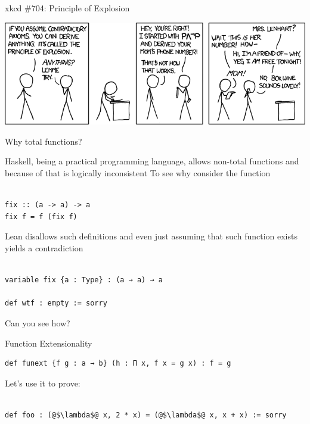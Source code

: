 \documentclass[pdf]{beamer}
\begin{document}
\begin{frame}{xkcd \#704: Principle of Explosion}
  \begin{center}
    \includegraphics[scale=0.48]{images/principle_of_explosion}
  \end{center}
\end{frame}

\begin{frame}[fragile]{Why total functions?}
  \begin{outline}
    \1 Haskell, being a practical programming language, allows non-total functions and because of that is logically inconsistent
    \1 To see why consider the function
    \\~\
    \begin{verbatim}
fix :: (a -> a) -> a
fix f = f (fix f)
    \end{verbatim}
    \pause
    \1 Lean disallows such definitions and even just assuming that such function exists yields a contradiction
    \\~\
    \begin{verbatim}
variable fix {a : Type} : (a → a) → a

def wtf : empty := sorry
    \end{verbatim}
    \1 Can you see how?
  \end{outline}
\end{frame}

\begin{frame}[fragile]{Function Extensionality}
  \begin{outline}
    \begin{verbatim}
def funext {f g : a → b} (h : Π x, f x = g x) : f = g
    \end{verbatim}
    \pause
    \1 Let's use it to prove:
    \\~\
    \begin{verbatim}
def foo : (@$\lambda$@ x, 2 * x) = (@$\lambda$@ x, x + x) := sorry
    \end{verbatim}
  \end{outline}
\end{frame}
\end{document}
